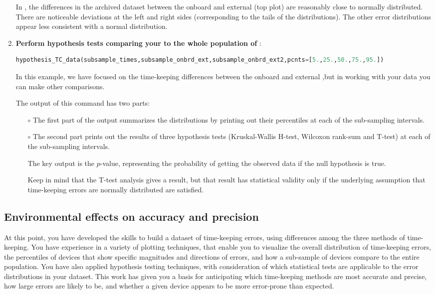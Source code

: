 \begin{enumerate}
	
	In , the differences in the archived dataset between the onboard and external \rtcs (top plot) are reasonably close to normally distributed.
	There are noticeable deviations at the left and right sides (corresponding to the tails of the distributions). 
	The other error distributions appear less consistent with a normal distribution.

	\item \textbf{Perform hypothesis tests comparing your \rtc to the whole population of \rtcs}:
\begin{lstlisting}[language=Python]
hypothesis_TC_data(subsample_times,subsample_onbrd_ext,subsample_onbrd_ext2,pcnts=[5.,25.,50.,75.,95.])
\end{lstlisting}
	In this example, we have focused on the time-keeping differences between the onboard and external \rtcs,but in working with your data you can make other comparisons.

	\smallskip
	The output of this command has two parts:
	\begin{itemize}
		\item[$\circ$] The first part of the output summarizes the distributions by printing out their percentiles at each of the sub-sampling intervals.
		\item[$\circ$] The second part prints out the results of three hypothesis tests (Kruskal-Wallis H-test, Wilcoxon rank-sum and T-test) at each of the sub-sampling intervals.
		
		\smallskip
		The key output is the $p$-value, representing the probability of getting the observed data if the null hypothesis is true.
		
		\smallskip
		Keep in mind that the T-test analysis gives a result, but that result has statistical validity only if the underlying assumption that time-keeping errors are normally distributed are satisfied.
	\end{itemize}

\end{enumerate}


\subsection{Environmental effects on \rtc accuracy and precision}
At this point, you have developed the skills to build a dataset of time-keeping errors, using differences among the three methods of time-keeping. 
You have experience in a variety of plotting techniques, that enable you to visualize the overall distribution of time-keeping errors, the percentiles of devices that show specific magnitudes and directions of errors, and how a sub-sample of devices compare to the entire population. 
You have also applied hypothesis testing techniques, with consideration of which statistical tests are applicable to the error distributions in your dataset.
This work has given you a basis for anticipating which time-keeping methods are most accurate and precise, how large errors are likely to be, and whether a given device appears to be more error-prone than expected.

